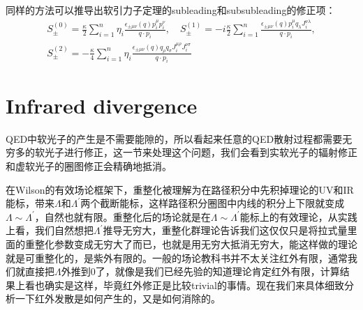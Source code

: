同样的方法可以推导出软引力子定理的subleading和subsubleading的修正项\cite{PhysRevD.90.084035,PhysRev.168.1623,White:2014qia,Broedel:2014fsa}：
\begin{equation}
	\begin{gathered}
		S_{\pm}^{(0)}=\frac{\kappa}{2}\sum_{i=1}^{n}\eta_{i}\frac{\epsilon_{\pm\mu\nu}(q)p_{i}^{\mu}p_{i}^{\nu}}{q\cdot p_{i}},\quad S_{\pm}^{(1)}=-i\frac{\kappa}{2}\sum_{i=1}^{n}\frac{\epsilon_{\pm\mu\nu}(q)p_{i}^{\mu}q_{\lambda}J_{i}^{\nu\lambda}}{q\cdot p_{i}}, \\
		S_{\pm}^{(2)}=-\frac{\kappa}{4}\sum_{i=1}^{n}\eta_{i}\frac{\epsilon_{\pm\mu\nu}(q)q_{\rho}q_{\sigma}J_{i}^{\mu\rho}J_{i}^{\nu\sigma}}{q\cdot p_{i}}
	\end{gathered}
\end{equation}
\section{Infrared divergence}
QED中软光子的产生是不需要能隙的，所以看起来任意的QED散射过程都需要无穷多的软光子进行修正，这一节来处理这个问题，我们会看到实软光子的辐射修正和虚软光子的圈图修正会精确地抵消。

在Wilson的有效场论框架下，重整化被理解为在路径积分中先积掉理论的UV和IR能标，带来$\Lambda$和$\Lambda^\prime$两个截断能标，这样路径积分圈图中内线的积分上下限就变成$\Lambda\sim\Lambda^\prime$，自然也就有限。重整化后的场论就是在$\Lambda\sim\Lambda^\prime$能标上的有效理论，从实践上看，我们自然想把$\Lambda^\prime$推导无穷大，重整化群理论告诉我们这仅仅只是将拉式量里面的重整化参数变成无穷大了而已，也就是用无穷大抵消无穷大，能这样做的理论就是可重整化的，是紫外有限的。一般的场论教科书并不太关注红外有限，通常我们就直接把$\Lambda$外推到0了，就像是我们已经先验的知道理论肯定红外有限，计算结果上看也确实是这样，毕竟红外修正是比较trivial的事情。现在我们来具体细致分析一下红外发散是如何产生的，又是如何消除的。

